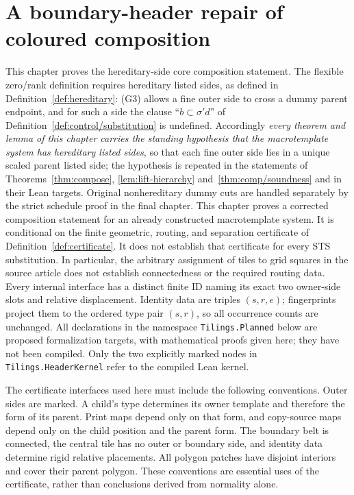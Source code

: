 \documentclass[11pt,a4paper]{article}
\theoremstyle{remark}
\newcommand{\lean}[1]{}
\newcommand{\uses}[1]{}
\newcommand{\leanok}{\textit{Lean kernel checked.}\ }
\begin{document}

\section{A boundary-header repair of coloured composition}

This chapter proves the hereditary-side core composition statement. The
flexible zero/rank definition requires hereditary listed sides, as defined
in Definition~\ref{def:hereditary}: (G3) allows a fine outer side to cross
a dummy parent endpoint, and for such a side the clause ``$b\subset\sigma'd$''
of Definition~\ref{def:control/substitution} is undefined. Accordingly
\emph{every theorem and lemma of this chapter carries the standing
hypothesis that the macrotemplate system has hereditary listed sides}, so
that each fine outer side lies in a unique scaled parent listed side; the
hypothesis is repeated in the statements of Theorems~\ref{thm:compose},
\ref{lem:lift-hierarchy} and~\ref{thm:comp/soundness} and in their Lean
targets. Original nonhereditary dummy cuts are
handled separately by the strict schedule proof in the final chapter.
This chapter proves a corrected composition statement for an already
constructed macrotemplate system. It is conditional on the finite geometric,
routing, and separation certificate of Definition~\ref{def:certificate}.
It does not establish that certificate for every STS substitution. In
particular, the arbitrary assignment of tiles to grid squares in the source
article does not establish connectedness or the required routing data.
Every internal interface has a distinct finite ID naming its exact two
owner-side slots and relative displacement. Identity data are triples
$(s,r,e)$; fingerprints project them to the ordered type pair $(s,r)$,
so all occurrence counts are unchanged.
All declarations in the namespace \texttt{Tilings.Planned} below are proposed
formalization targets, with mathematical proofs given here; they have not
been compiled. Only the two explicitly marked nodes in
\texttt{Tilings.HeaderKernel} refer to the compiled Lean kernel.

The certificate interfaces used here must include the following conventions.
Outer sides are marked. A child's type determines its owner template and
therefore the form of its parent. Print maps depend only on that form, and
copy-source maps depend only on the child position and the parent form.
The boundary belt is connected, the central tile has no outer or boundary
side, and identity data determine rigid relative placements. All polygon
patches have disjoint interiors and cover their parent polygon. These
conventions are essential uses of the certificate, rather than conclusions
derived from normality alone.
\end{document}
